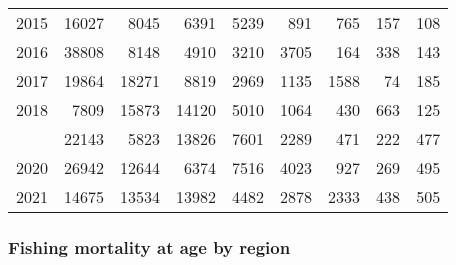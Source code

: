 \documentclass[
]{article}
\begin{document}
\begin{longtable}[t]{lrrrrrrrr}
2015 & 16027 & 8045 & 6391 & 5239 & 891 & 765 & 157 & 108\\
2016 & 38808 & 8148 & 4910 & 3210 & 3705 & 164 & 338 & 143\\
2017 & 19864 & 18271 & 8819 & 2969 & 1135 & 1588 & 74 & 185\\
2018 & 7809 & 15873 & 14120 & 5010 & 1064 & 430 & 663 & 125\\
\addlinespace
2019 & 22143 & 5823 & 13826 & 7601 & 2289 & 471 & 222 & 477\\
2020 & 26942 & 12644 & 6374 & 7516 & 4023 & 927 & 269 & 495\\
2021 & 14675 & 13534 & 13982 & 4482 & 2878 & 2333 & 438 & 505\\*
\end{longtable}

\hypertarget{fishing-mortality-at-age-by-region}{%
\subsubsection{Fishing mortality at age by
region}\label{fishing-mortality-at-age-by-region}}
\end{document}
